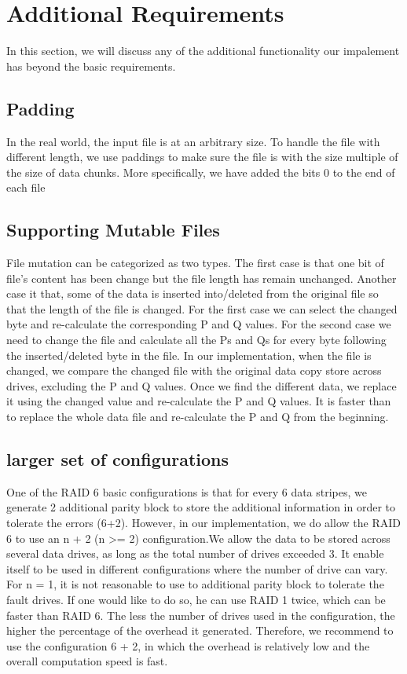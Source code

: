 \section{Additional Requirements}

In this section, we will discuss any of the additional functionality our impalement has beyond the basic requirements. 

\subsection{Padding}

In the real world, the input file is at an arbitrary size. To handle the file with different length, we use paddings to make sure the file is with the size multiple of the size of data chunks. More specifically, we have added the bits 0 to the end of each file 

\subsection{Supporting Mutable Files}

File mutation can be categorized as two types. The first case is that one bit of file’s content has been change but the file length has remain unchanged. Another case it that, some of the data is inserted into/deleted from the original file so that the length of the file is changed. For the first case we can select the changed byte and re-calculate the corresponding P and Q values. For the second case we need to change the file and calculate all the Ps and Qs for every byte following the inserted/deleted byte in the file.
In our implementation, when the file is changed, we compare the changed file with the original data copy store across drives, excluding the P and Q values. Once we find the different data, we replace it using the changed value and re-calculate the P and Q values. It is faster than to replace the whole data file and re-calculate the P and Q from the beginning.

\subsection{larger set of configurations}

One of the RAID 6 basic configurations is that for every 6 data stripes, we generate 2 additional parity block to store the additional information in order to tolerate the errors (6+2). However, in our implementation, we do allow the RAID 6 to use an n + 2 (n >= 2) configuration.We allow the data to be stored across several data drives, as long as the total number of drives exceeded 3. It enable itself to be used in different configurations where the number of drive can vary. For n = 1, it is not reasonable to use to additional parity block to tolerate the fault drives. If one would like to do so, he can use RAID 1 twice, which can be faster than RAID 6. The less the number of drives used in the configuration, the higher the percentage of the overhead it generated. Therefore, we recommend to use the configuration 6 + 2, in which the overhead is relatively low and the overall computation speed is fast.


